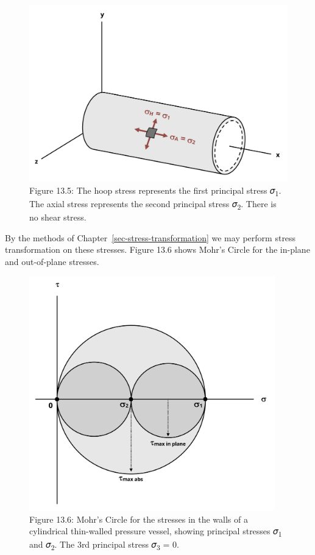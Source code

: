 \documentclass[
  letterpaper,
  DIV=11,
  numbers=noendperiod]{scrreprt}
\theoremstyle{definition}
\theoremstyle{remark}
\begin{document}
\begin{figure}[H]

{\centering \includegraphics[width=5.17708in,height=\textheight]{images/CH13 PNGs/figure 13.5.png}

}

\caption{Figure 13.5: The hoop stress represents the first principal
stress 𝜎\textsubscript{1}. The axial stress represents the second
principal stress 𝜎\textsubscript{2}. There is no shear stress.}

\end{figure}%

By the methods of Chapter~\ref{sec-stress-transformation} we may perform
stress transformation on these stresses. Figure 13.6 shows Mohr's Circle
for the in-plane and out-of-plane stresses.

\begin{figure}[H]

{\centering \includegraphics[width=4.19792in,height=\textheight]{images/CH13 PNGs/figure 13.6.png}

}

\caption{Figure 13.6: Mohr's Circle for the stresses in the walls of a
cylindrical thin-walled pressure vessel, showing principal stresses
𝜎\textsubscript{1} and 𝜎\textsubscript{2}. The 3rd principal stress
𝜎\textsubscript{3} = 0.}

\end{figure}%
\end{document}
